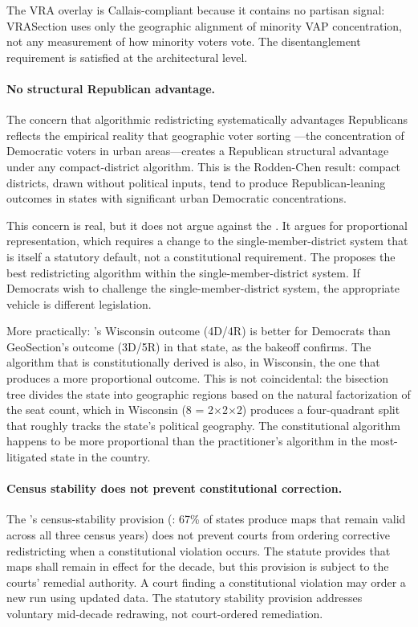 The VRA overlay is Callais-compliant because it contains no partisan
signal: VRASection uses only the geographic alignment of minority VAP
concentration, not any measurement of how minority voters vote.
The \callais{} disentanglement requirement is satisfied at the architectural
level.

\paragraph{No structural Republican advantage.}
The concern that algorithmic redistricting systematically advantages
Republicans reflects the empirical reality that geographic voter sorting
\citep{rodden2019,chen2013}---the concentration of Democratic voters in
urban areas---creates a Republican structural advantage under any compact-district
algorithm.
This is the Rodden-Chen result: compact districts, drawn without political
inputs, tend to produce Republican-leaning outcomes in states with
significant urban Democratic concentrations.

This concern is real, but it does not argue against the \dia{}.
It argues for proportional representation, which requires a change to the
single-member-district system that is itself a statutory default, not a
constitutional requirement.
The \dia{} proposes the best redistricting algorithm within the
single-member-district system.
If Democrats wish to challenge the single-member-district system, the
appropriate vehicle is different legislation.

More practically: \ar{}'s Wisconsin outcome (4D/4R) is better for Democrats
than GeoSection's outcome (3D/5R) in that state, as the bakeoff confirms.
The algorithm that is constitutionally derived is also, in Wisconsin, the
one that produces a more proportional outcome.
This is not coincidental: the \hh{} bisection tree divides the state into
geographic regions based on the natural factorization of the seat count,
which in Wisconsin (8 = 2$\times$2$\times$2) produces a four-quadrant split
that roughly tracks the state's political geography.
The constitutional algorithm happens to be more proportional than the
practitioner's algorithm in the most-litigated state in the country.

\paragraph{Census stability does not prevent constitutional correction.}
The \dia{}'s census-stability provision (\citet{b15paper}: 67\% of states
produce maps that remain valid across all three census years) does not prevent
courts from ordering corrective redistricting when a constitutional violation
occurs.
The statute provides that maps shall remain in effect for the decade, but
this provision is subject to the courts' remedial authority.
A court finding a constitutional violation may order a new \ar{} run using
updated data.
The statutory stability provision addresses voluntary mid-decade redrawing,
not court-ordered remediation.

